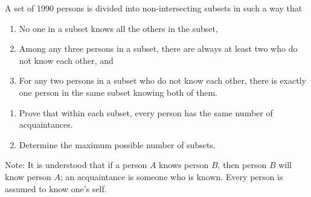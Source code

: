 A set of 1990 persons is divided into non-intersecting subsets in such a way that
\begin{enumerate}
	\item No one in a subset knows all the others in the subset,
	\item Among any three persons in a subset, there are always at least two who do not know each other, and
	\item For any two persons in a subset who do not know each other, there is exactly one person in the same subset knowing both of them.
\end{enumerate}
\begin{enumerate}[label=(\alph*)]
	\item Prove that within each subset, every person has the same number of acquaintances.
	\item Determine the maximum possible number of subsets.
\end{enumerate}
Note: It is understood that if a person $A$ knows person $B$, then person $B$ will know person $A$; an acquaintance is someone who is known. Every person is assumed to know one's self.